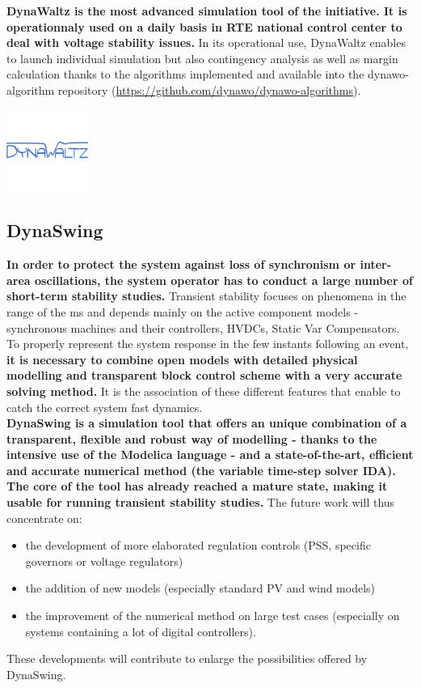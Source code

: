 \documentclass[a4paper, 12pt]{report}
\begin{document}
\textbf{DynaWaltz is the most advanced simulation tool of the \Dynawo initiative. It is operationnaly used on a daily basis in RTE national control center to deal with voltage stability issues.} In its operational use, DynaWaltz enables to launch individual simulation but also contingency analysis as well as  margin calculation thanks to the algorithms implemented and available into the dynawo-algorithm repository (\url{https://github.com/dynawo/dynawo-algorithms}).

\begin{center}
\includegraphics[width=0.2\textwidth]{../resources/DynaWaltz.png}
\end{center}

\newpage
\subsection{DynaSwing}

\textbf{In order to protect the system against loss of synchronism or inter-area oscillations, the system operator has to conduct a large number of short-term stability studies. }Transient stability focuses on phenomena in the range of the ms and depends mainly on the active component models - synchronous machines and their controllers, HVDCs, Static Var Compensators. \\

To properly represent the system response in the few instants following an event, \textbf{it is necessary to combine open models with detailed physical modelling and transparent block control scheme with a very accurate solving method.} It is the association of these different features that enable to catch the correct system fast dynamics. \\

\textbf{DynaSwing is a simulation tool that offers an unique combination of a transparent, flexible and robust way of modelling - thanks to the intensive use of the Modelica language - and a state-of-the-art, efficient and accurate numerical method (the variable time-step solver IDA).} \\

\textbf{The core of the tool has already reached a mature state, making it usable for running transient stability studies.} The future work will thus concentrate on:
\begin{itemize}
\item the development of more elaborated regulation controls (PSS, specific governors or voltage regulators)
\item the addition of new models (especially standard PV and wind models)
\item the improvement of the numerical method on large test cases (especially on systems containing a lot of digital controllers).
\end{itemize}
These developments will contribute to enlarge the possibilities offered by DynaSwing.
\end{document}

